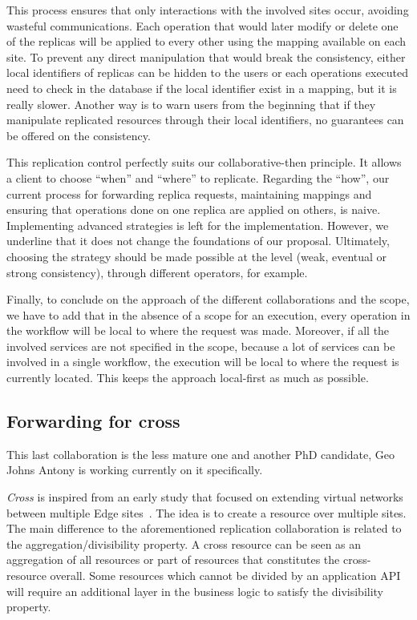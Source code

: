 This process ensures that only interactions with the involved sites
occur, avoiding wasteful communications.
%
Each operation that would later modify or delete one of the replicas
will be applied to every other using the mapping available on each
site.
%
To prevent any direct manipulation that would break the consistency,
either local identifiers of replicas can be hidden to the users or
each operations executed need to check in the database if the local
identifier exist in a mapping, but it is really slower.
%
Another way is to warn users from the beginning that if they
manipulate replicated resources through their local identifiers, no
guarantees can be offered on the consistency.


This replication control perfectly suits our collaborative-then
principle.
%
It allows a client to choose ``when'' and ``where'' to replicate.
%
Regarding the ``how'', our current process for forwarding replica
requests, maintaining mappings and ensuring that operations done on
one replica are applied on others, is naive.
%
Implementing advanced strategies is left for the implementation.
%
However, we underline that it does not change the foundations of our
proposal.
%
Ultimately, choosing the strategy should be made possible at the \scl
level (\eg weak, eventual or strong consistency), through different
operators, for example.


Finally, to conclude on the approach of the different collaborations
and the scope, we have to add that in the absence of a scope for an
execution, every operation in the workflow will be local to where the
request was made.
%
Moreover, if all the involved services are not specified in the scope,
because a lot of services can be involved in a single workflow, the
execution will be local to where the request is currently located.
%
This keeps the approach local-first as much as possible.





\subsection{Forwarding for cross}
\label{ssec:scl-cross}

This last collaboration is the less mature one and another PhD
candidate, Geo Johns Antony is working currently on it specifically.


\emph{Cross} is inspired from an early study that focused on extending
virtual networks between multiple Edge sites~\cite{ELNC20}.
%
The idea is to create a resource over multiple sites.
%
The main difference to the aforementioned replication collaboration is
related to the aggregation/divisibility property.
%
%
A cross resource can be seen as an aggregation of all resources or
part of resources that constitutes the cross-resource overall.
%
Some resources which cannot be divided by an application API will
require an additional layer in the business logic to satisfy the
divisibility property.


